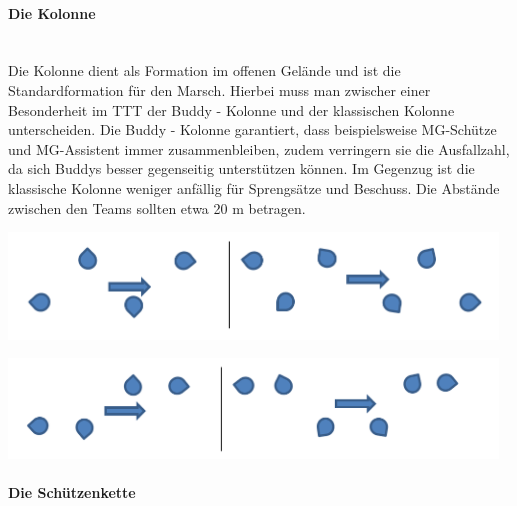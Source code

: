 \paragraph{Die Kolonne}$\ $\\

	Die Kolonne dient als Formation im offenen Gelände und ist die Standardformation für den Marsch. Hierbei muss man zwischer einer Besonderheit im \ac{TTT} der Buddy - Kolonne und der klassischen Kolonne unterscheiden. Die Buddy - Kolonne garantiert, dass beispielsweise MG-Schütze und MG-Assistent immer zusammenbleiben, zudem verringern sie die Ausfallzahl, da sich Buddys besser gegenseitig unterstützen können. Im Gegenzug ist die klassische Kolonne weniger anfällig für Sprengsätze und Beschuss. Die Abstände zwischen den Teams sollten etwa 20 m betragen.\\
		\begin{minipage}[t]{1\textwidth}
			\includegraphics[width=13cm]{./Grafiken/Abschnitt/Kolonne.png}
			\label{Kolonne}
		\end{minipage}
		\begin{minipage}[t]{1\textwidth}
			\includegraphics[width=13cm]{./Grafiken/Abschnitt/Buddykolonne.png}
		\end{minipage}

\paragraph{Die Schützenkette}$\ $\\

